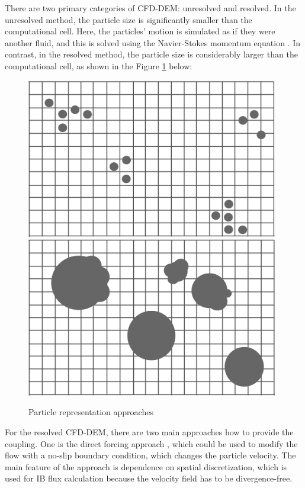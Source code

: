 There are two primary categories of CFD-DEM: unresolved and resolved. In the unresolved method, the particle size is significantly smaller than the computational cell. Here, the particles' motion is simulated as if they were another fluid, and this is solved using the Navier-Stokes momentum equation \cite{kloss2012models}. In contrast, in the resolved method, the particle size is considerably larger than the computational cell, as shown in the Figure \ref{fig:res_unres} below:
\begin{figure}[h]
    \centering
    \includegraphics[width=11cm]{Images/resolved_cfddem.png}
    \includegraphics[width=11cm]{Images/unresolved_cfddem.png}
    \caption{Particle representation approaches}
    \label{fig:res_unres}
\end{figure}
For the resolved CFD-DEM, there are two main approaches how to provide the coupling. One is the direct forcing approach \cite{uhlmann2005immersed}, which could be used to modify the flow with a no-slip boundary condition, which changes the particle velocity. The main feature of the approach is dependence on spatial discretization, which is used for IB flux calculation because the velocity field has to be divergence-free.

